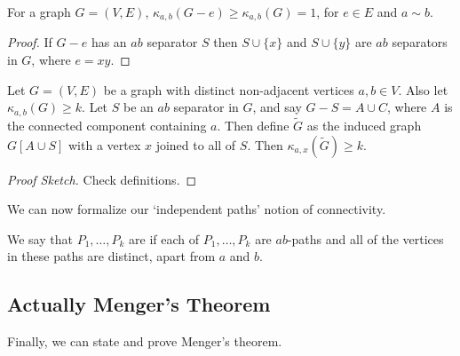 \begin{lemma}
	For a graph $G = (V, E)$, 
	$\kappa_{a, b}(G - e) \geq \kappa_{a, b}(G) = 1$, for $e \in E$ and $a \sim b$.
\end{lemma}
\begin{proof}
	If $G - e$ has an $ab$ separator $S$ then $S \cup \{x\}$ and $S \cup \{y\}$ are $ab$ separators in $G$, where $e = xy$.
\end{proof}



\begin{lemma}
	Let $G = (V, E)$ be a graph with distinct non-adjacent vertices $a, b \in V$. Also let $\kappa_{a, b}(G) \geq k$. Let $S$ be an $ab$ separator in $G$, and say $G - S = A \cup C$, where $A$ is the connected component containing $a$. Then define $\tilde{G}$ as the induced graph $G[A \cup S]$ with a vertex $x$ joined to all of $S$. Then $\kappa_{a, x}(\tilde{G}) \geq k$.
\end{lemma}
\begin{proof}[Proof Sketch]
	Check definitions.
\end{proof}

We can now formalize our `independent paths' notion of connectivity.

\begin{definition}
	We say that $P_1, \dots, P_k$ are  if each of $P_1, \dots, P_k$ are $ab$-paths and all of the vertices in these paths are distinct, apart from $a$ and $b$.
\end{definition}

\subsection{Actually Menger's Theorem}

Finally, we can state and prove Menger's theorem.

